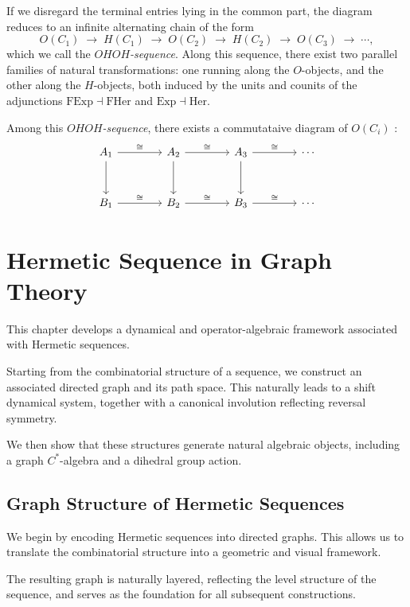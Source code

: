 \documentclass[11pt]{book}
\theoremstyle{definition}
\theoremstyle{plain}
\theoremstyle{remark}
\begin{document}
If we disregard the terminal entries lying in the common part, the diagram reduces 
to an infinite alternating chain of the form
\[
   O(C_1) \;\to\; H(C_1) \;\to\; O(C_2) \;\to\; H(C_2) \;\to\; O(C_3) \;\to\; \cdots,
\]
which we call the \emph{$OHOH$-sequence}. Along this sequence, there exist two 
parallel families of natural transformations: one running along the $O$-objects, 
and the other along the $H$-objects, both induced by the units and counits of the 
adjunctions $\mathrm{FExp}\dashv\mathrm{FHer}$ and $\mathrm{Exp}\dashv\mathrm{Her}$.

Among this \emph{$OHOH$-sequence}, there exists a commutataive diagram of $O(C_i)$ :
\[
\begin{tikzcd}[row sep=3em, column sep=4em]
A_1 \arrow[r,"\cong"] \arrow[d] & A_2 \arrow[r,"\cong"] \arrow[d] & A_3 \arrow[r,"\cong"] \arrow[d] & \cdots \\
B_1 \arrow[r,"\cong"]           & B_2 \arrow[r,"\cong"]           & B_3 \arrow[r,"\cong"]           & \cdots
\end{tikzcd}
\]

\chapter{Hermetic Sequence in Graph Theory}

This chapter develops a dynamical and operator-algebraic framework
associated with Hermetic sequences.

Starting from the combinatorial structure of a sequence,
we construct an associated directed graph and its path space.
This naturally leads to a shift dynamical system,
together with a canonical involution reflecting reversal symmetry.

We then show that these structures generate natural algebraic objects,
including a graph $C^*$-algebra and a dihedral group action.

\section{Graph Structure of Hermetic Sequences}

We begin by encoding Hermetic sequences into directed graphs.
This allows us to translate the combinatorial structure
into a geometric and visual framework.

The resulting graph is naturally layered,
reflecting the level structure of the sequence,
and serves as the foundation for all subsequent constructions.
\end{document}
